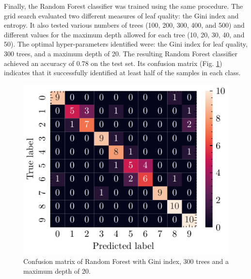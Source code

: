 \documentclass[journal]{IEEEtran}
\begin{document}
Finally, the Random Forest classifier was trained using the same procedure. The grid search evaluated two different measures of leaf quality: the Gini index and entropy. It also tested various numbers of trees (100, 200, 300, 400, and 500) and different values for the maximum depth allowed for each tree (10, 20, 30, 40, and 50). The optimal hyper-parameters identified were: the Gini index for leaf quality, 300 trees, and a maximum depth of 20. The resulting Random Forest classifier achieved an accuracy of 0.78 on the test set. Its confusion matrix (Fig. \ref{fig:rf_confusion_matrix}) indicates that it successfully identified at least half of the samples in each class.
\begin{figure}[ht]
    \centering
    \includegraphics[width=\linewidth]{confusion_matrix_rf.pdf}
    \caption{Confusion matrix of Random Forest with Gini index, 300 trees and a maximum depth of 20.}
    \label{fig:rf_confusion_matrix}
\end{figure}
\end{document}
